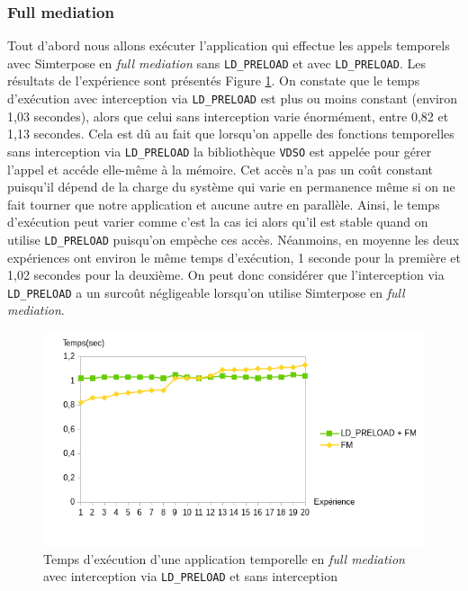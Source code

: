 \subsubsection{Full mediation}
 Tout d'abord nous allons exécuter l'application qui effectue les appels temporels avec Simterpose en \textit{full mediation} sans \texttt{LD\_PRELOAD} et avec \texttt{LD\_PRELOAD}. Les résultats de l'expérience sont présentés Figure \ref{Temps_FM}. On constate que le temps d'exécution avec interception via \texttt{LD\_PRELOAD} est plus ou moins constant (environ 1,03 secondes), alors que celui sans interception varie énormément, entre 0,82 et 1,13 secondes. Cela est dû au fait que lorsqu'on appelle des fonctions temporelles sans interception via \texttt{LD\_PRELOAD} la bibliothèque \texttt{VDSO} est appelée pour gérer l'appel et accéde elle-même à la mémoire. Cet accès n'a pas un coût constant puisqu'il dépend de la charge du système qui varie en permanence même si on ne fait tourner que notre application et aucune autre en parallèle. Ainsi, le temps d'exécution peut varier comme c'est la cas ici alors qu'il est stable quand on utilise \texttt{LD\_PRELOAD} puisqu'on empèche ces accès. Néanmoins, en moyenne les deux expériences ont environ le même temps d'exécution, 1 seconde pour la première et 1,02 secondes pour la deuxième. On peut donc considérer que l'interception via \texttt{LD\_PRELOAD} a un surcoût négligeable lorsqu'on utilise Simterpose en \textit{full mediation}.

\begin{figure}[H]
  \centering
    \includegraphics[scale=0.80]{mesures/graph/Temps_FM.png}
    \caption{Temps d'exécution d'une application temporelle en \textit{full mediation} avec interception via \texttt{LD\_PRELOAD} et sans interception}
    \label{Temps_FM}
\end{figure}

